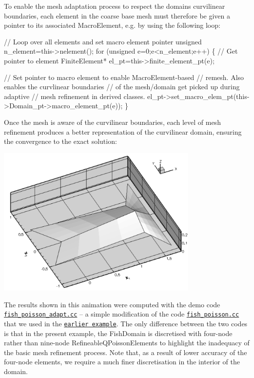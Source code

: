 To enable the mesh adaptation process to respect the domain\textquotesingle{}s curvilinear boundaries, each element in the coarse base mesh must therefore be given a pointer to its associated {\ttfamily Macro\+Element}, e.\+g. by using the following loop\+:  
\begin{DoxyCodeInclude}
 \textcolor{comment}{// Loop over all elements and set macro element pointer}
 \textcolor{keywordtype}{unsigned} n\_element=this->nelement();
 \textcolor{keywordflow}{for} (\textcolor{keywordtype}{unsigned} e=0;e<n\_element;e++)
  \{
   \textcolor{comment}{// Get pointer to element}
   FiniteElement* el\_pt=this->finite\_element\_pt(e);
   
   \textcolor{comment}{// Set pointer to macro element to enable MacroElement-based}
   \textcolor{comment}{// remesh. Also enables the curvlinear boundaries}
   \textcolor{comment}{// of the mesh/domain get picked up during adaptive}
   \textcolor{comment}{// mesh refinement in derived classes.}
   el\_pt->set\_macro\_elem\_pt(this->Domain\_pt->macro\_element\_pt(e));
  \}

\end{DoxyCodeInclude}


Once the mesh is aware of the curvilinear boundaries, each level of mesh refinement produces a better representation of the curvilinear domain, ensuring the convergence to the exact solution\+:

 
\begin{DoxyImage}
\includegraphics[width=0.75\textwidth]{fish_poisson_adapt_soln}
\end{DoxyImage}


The results shown in this animation were computed with the demo code \href{../../../../demo_drivers/poisson/fish_poisson2/fish_poisson_adapt.cc}{\tt fish\+\_\+poisson\+\_\+adapt.\+cc} -- a simple modification of the code \href{../../../../demo_drivers/poisson/fish_poisson/fish_poisson.cc}{\tt fish\+\_\+poisson.\+cc} that we used in the \href{../../../../doc/poisson/fish_poisson/html/index.html}{\tt earlier example}. The only difference between the two codes is that in the present example, the {\ttfamily Fish\+Domain} is discretised with four-\/node rather than nine-\/node {\ttfamily Refineable\+Q\+Poisson\+Elements} to highlight the inadequacy of the basic mesh refinement process. Note that, as a result of lower accuracy of the four-\/node elements, we require a much finer discretisation in the interior of the domain.



